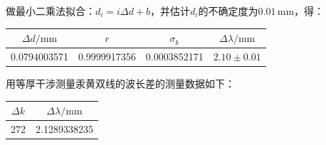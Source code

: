\documentclass[a4paper,fontset=windows]{ctexart}
\begin{document}
做最小二乘法拟合：$d_i = i\Delta d+b$，并估计$d_i$的不确定度为$0.01\,\mathrm{mm}$，得：
\begin{table}[!ht]
    \centering
    \begin{tabular}{|c|c|c|c|}
        \hline
        $\Delta d/\mathrm{mm}$ & $r$ & $\sigma_k$ & $\Delta\lambda/\mathrm{mm}$\\
        \hline
        0.0794003571 & 0.9999917356 & 0.0003852171 & $2.10\pm0.01$ \\
        \hline
    \end{tabular}
\end{table}

用等厚干涉测量汞黄双线的波长差的测量数据如下：

\begin{table}[!ht]
    \centering
    \begin{tabular}{|c|c|}
        \hline
        $\Delta k$ & $\Delta\lambda/\mathrm{mm}$ \\
        \hline
        272 & 2.1289338235 \\
        \hline
    \end{tabular}
\end{table}
\end{document}
